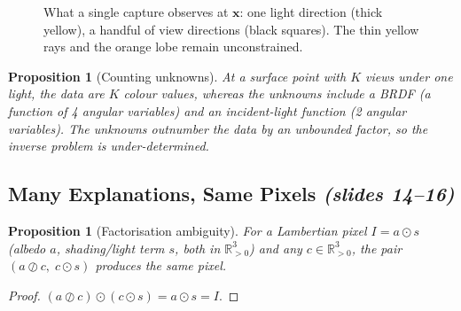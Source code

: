 \documentclass[11pt,a4paper]{article}
\theoremstyle{definition}
\theoremstyle{plain}
\newtheorem{proposition}[definition]{Proposition}
\theoremstyle{remark}
\newcommand{\slides}[2]{\texorpdfstring{\emph{(slides #1--#2)}}{(slides #1-#2)}}
\newcommand{\R}{\mathbb{R}}
\newcommand{\x}{{\bm{x}}}
\begin{document}
\begin{figure}[!htbp]\centering
{}
\caption{What a single capture observes at $\x$: one light direction (thick yellow), a handful of view directions (black squares). The thin yellow rays and the orange lobe remain unconstrained.}
\end{figure}

\begin{proposition}[Counting unknowns]
At a surface point with $K$ views under one light, the data are $K$ colour values, whereas the unknowns include a BRDF (a function of 4 angular variables) and an incident-light function (2 angular variables). The unknowns outnumber the data by an unbounded factor, so the inverse problem is under-determined.
\end{proposition}

\subsection{Many Explanations, Same Pixels \slides{14}{16}}

\begin{proposition}[Factorisation ambiguity]\label{prop:amb}
For a Lambertian pixel $I=a\odot s$ (albedo $a$, shading/light term $s$, both in $\R^3_{>0}$) and any $c\in\R^3_{>0}$, the pair $(a\oslash c,\;c\odot s)$ produces the same pixel.
\end{proposition}
\begin{proof}
$(a\oslash c)\odot(c\odot s)=a\odot s=I$.
\end{proof}
\end{document}
